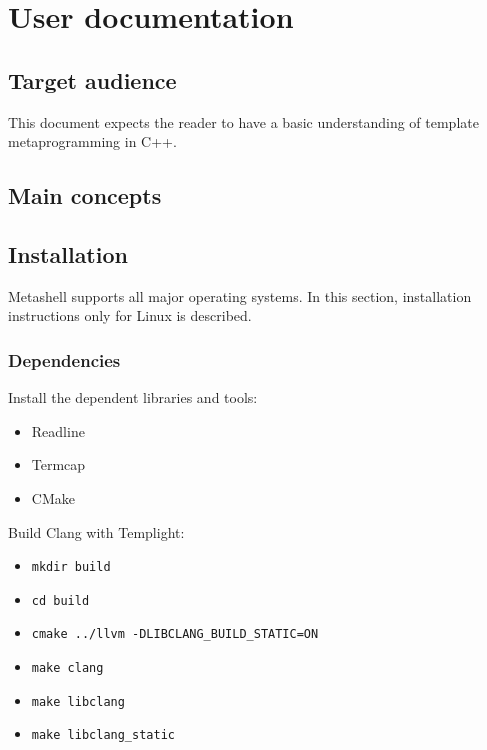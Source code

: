 

\chapter{User documentation}

\section{Target audience}

This document expects the reader to have a basic understanding of template
metaprogramming in C++.

\section{Main concepts}

\section{Installation}

Metashell supports all major operating systems. In this section, installation
instructions only for Linux is described.

\subsection{Dependencies}

Install the dependent libraries and tools:

\begin{itemize}
    \item Readline
    \item Termcap
    \item CMake
\end{itemize}

Build Clang with Templight\cite{templight}:

\begin{itemize}
    \item \lstinline$mkdir build$
    \item \lstinline$cd build$
    \item \lstinline$cmake ../llvm -DLIBCLANG_BUILD_STATIC=ON$
    \item \lstinline$make clang$
    \item \lstinline$make libclang$
    \item \lstinline$make libclang_static$
\end{itemize}

